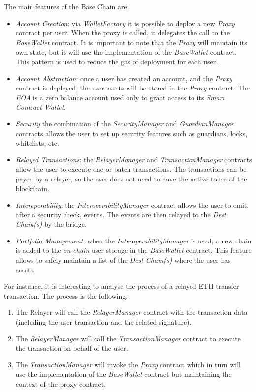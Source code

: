 The main features of the Base Chain are:
\begin{itemize}
    \item \textit{Account Creation}: via \textit{WalletFactory} it is possible to deploy a new \textit{Proxy} contract per user. When the proxy is called, it delegates the call to the \textit{BaseWallet} contract. It is important to note that the \textit{Proxy} will maintain its own state, but it will use the implementation of the \textit{BaseWallet} contract. This pattern is used to reduce the gas of deployment for each user.
    \item \textit{Account Abstraction}: once a user has created an account, and the \textit{Proxy} contract is deployed, the user assets will be stored in the \textit{Proxy} contract. The \textit{EOA} is a zero balance account used only to grant access to its \textit{Smart Contract Wallet}. 
    \item \textit{Security} the combination of the \textit{SecurityManager} and \textit{GuardianManager} contracts allows the user to set up security features such as guardians, locks, whitelists, etc.
    \item \textit{Relayed Transactions}: the \textit{RelayerManager} and \textit{TransactionManager} contracts allow the user to execute one or batch transactions. The transactions can be payed by a relayer, so the user does not need to have the native token of the blockchain. 
    \item \textit{Interoperability}: the \textit{InteroperabilityManager} contract allows the user to emit, after a security check, events. The events are then relayed to the \textit{Dest Chain(s)} by the bridge.
    \item \textit{Portfolio Management}: when the \textit{InteroperabilityManager} is used, a new chain is added to the \textit{on-chain} user storage in the \textit{BaseWallet} contract. This feature allows to safely maintain a list of the \textit{Dest Chain(s)} where the user has assets.
\end{itemize}

For instance, it is interesting to analyse the process of a relayed ETH transfer transaction. The process is the following:
\begin{enumerate}
    \item The Relayer will call the \textit{RelayerManager} contract with the transaction data (including the user transaction and the related signature).
    \item The \textit{RelayerManager} will call the \textit{TransactionManager} contract to execute the transaction on behalf of the user.
    \item The \textit{TransactionManager} will invoke the \textit{Proxy} contract which in turn will use the implementation of the \textit{BaseWallet} contract but maintaining the context of the proxy contract.
\end{enumerate}

